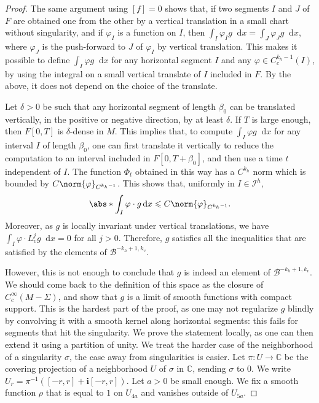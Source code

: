 \documentclass[11pt, a4paper, oneside, final, pagebackref]{amsart}
\newcommand{\boI}{\mathcal{I}}
\newcommand{\boB}{\mathcal{B}}
\newcommand{\C}{\mathbb{C}}
\newcommand{\dd}{\mathop{}\!\mathrm{d}}
\newcommand{\ic}{\mathbf{i}}
\renewcommand{\phi}{\varphi}
\renewcommand{\leq}{\leqslant}
\theoremstyle{definition}
\numberwithin{equation}{section}
\begin{document}
\begin{proof}
The same argument using $[f] = 0$ shows that, if two segments $I$ and $J$ of
$F$ are obtained one from the other by a vertical translation in a small
chart without singularity, and if $\phi_I$ is a function on $I$, then $\int_I
\phi_I g \dd x = \int_J \phi_J g \dd x$, where $\phi_J$ is the push-forward
to $J$ of $\phi_I$ by vertical translation. This makes it possible to define
$\int_I \phi g \dd x$ for any horizontal segment $I$ and any $\phi \in
C^{k_h-1}_c(I)$, by using the integral on a small vertical translate of $I$
included in $F$. By the above, it does not depend on the choice of the
translate.

Let $\delta>0$ be such that any horizontal segment of length $\beta_0$ can be
translated vertically, in the positive or negative direction, by at least
$\delta$. If $T$ is large enough, then $F[0,T]$ is $\delta$-dense in $M$.
This implies that, to compute $\int_I \phi g \dd x$ for any interval $I$ of
length $\beta_0$, one can first translate it vertically to reduce the
computation to an interval included in $F[0,T+\beta_0]$, and then use a time
$t$ independent of $I$. The function $\Phi_t$ obtained in this way has a
$C^{k_h}$ norm which is bounded by $C\norm{\phi}_{C^{k_h-1}}$. This shows
that, uniformly in $I \in \boI^h$,
\begin{equation*}
  \abs*{\int_I \phi \cdot g \dd x} \leq C \norm{\phi}_{C^{k_h-1}}.
\end{equation*}
Moreover, as $g$ is locally invariant under vertical translations, we have
$\int_I \phi \cdot L_v^j g \dd x = 0$ for all $j>0$. Therefore, $g$ satisfies
all the inequalities that are satisfied by the elements of $\boB^{-k_h+1,
k_v}$.

However, this is not enough to conclude that $g$ is indeed an element of
$\boB^{-k_h+1, k_v}$. We should come back to the definition of this space as
the closure of $C^\infty_c(M-\Sigma)$, and show that $g$ is a limit of smooth
functions with compact support. This is the hardest part of the proof, as one
may not regularize $g$ blindly by convolving it with a smooth kernel along
horizontal segments: this fails for segments that hit the singularity. We
prove the statement locally, as one can then extend it using a partition of
unity. We treat the harder case of the neighborhood of a singularity
$\sigma$, the case away from singularities is easier. Let $\pi: U \to \C$ be
the covering projection of a neighborhood $U$ of $\sigma$ in $\C$, sending
$\sigma$ to $0$. We write $U_r = \pi^{-1}([-r, r] + \ic [-r, r])$. Let $a>0$
be small enough. We fix a smooth function $\rho$ that is equal to $1$ on
$U_{4a}$ and vanishes outside of $U_{5a}$.


\end{proof}
\end{document}
